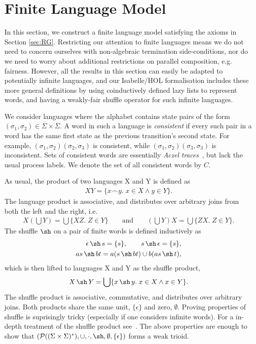 \documentclass{llncs}
\DeclareMathOperator{\sha}{\sh}
\begin{document}
\section{Finite Language Model}
\label{sec:Model}

In this section, we construct a finite language model satisfying the
axioms in Section \ref{sec:RG}. Restricting our attention to finite
languages means we do not need to concern ourselves with non-algebraic
termination side-conditions, nor do we need to worry about additional
restrictions on parallel composition, e.g. fairness. However, all the
results in this section can easily be adapted to potentially
infinite languages, and our Isabelle/HOL formalisation includes these more
general definitions by using coinductively defined lazy lists to
represent words, and having a weakly-fair shuffle operator for such
infinite languages.

We consider languages where the alphabet contains state pairs of the
form $(\sigma_1,\sigma_2) \in \Sigma \times \Sigma$. A word in such a
language is \emph{consistent} if every such pair in a word has the
same first state as the previous transition's second state. For
example, $(\sigma_1,\sigma_2)(\sigma_2,\sigma_3)$ is consistent, while
$(\sigma_1,\sigma_2)(\sigma_3,\sigma_3)$ is inconsistent. Sets of
consistent words are essentially \emph{Aczel
  traces}~\cite{boer_formal_1999}, but lack the usual process
labels. We denote the set of all consistent words by $C$.

As usual, the product of two languages X and Y is defined as
\begin{align*}
XY = \{x\frown y.\; x \in X \land y \in Y\}.
\end{align*}
The language product is associative, and distributes over arbitrary
joins from both the left and the right, i.e.
\begin{align*}
X(\bigcup Y) = \bigcup\{XZ.\; Z \in Y\} \qquad \text{and} \qquad (\bigcup Y)X = \bigcup\{ZX.\; Z \in Y\}.
\end{align*}
The shuffle $\sha$ on a pair
of finite words is defined inductively as
\begin{align*}
\epsilon \sha s = \{s\}, \qquad s \sha \epsilon = \{s\},\\
as \sha bt = a(s \sha bt) \cup b(as \sha t),
\end{align*}
which is then lifted to languages X and Y as the shuffle product,
\begin{align*}
X \sha Y = \bigcup\{x \sha y.\; x \in X \land x \in Y\}.
\end{align*}
The shuffle product is associative, commutative, and distributes over
arbitrary joins. Both products share the same unit, $\{\epsilon\}$ and
zero, $\emptyset$. Proving properties of shuffle is suprisingly
tricky (especially if one considers infinite words). For a in-depth
treatment of the shuffle product see~\cite{shufflethings}. The
above properties are enough to show that $(\mathcal{P}((\Sigma\times\Sigma)^*),
\cup, \cdot,\sha, \emptyset, \{\epsilon\})$ forms a weak trioid.
\end{document}
